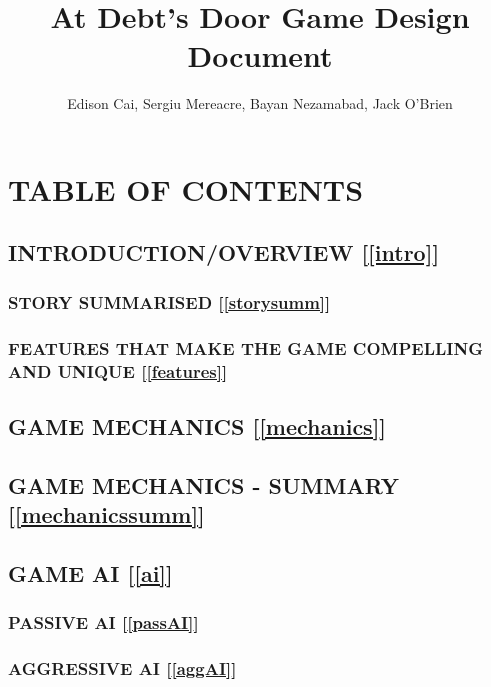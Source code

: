 \documentclass{article}
\author{Edison Cai, Sergiu Mereacre, Bayan Nezamabad, Jack O'Brien}
\title{At Debt's Door Game Design Document}
\begin{document}
\maketitle
\setcounter{section}{-1}
\section{TABLE OF CONTENTS}

%

\subsection{INTRODUCTION/OVERVIEW [\ref{intro}]}

\subsubsection{STORY SUMMARISED [\ref{storysumm}]}

\subsubsection{FEATURES THAT MAKE THE GAME COMPELLING AND UNIQUE [\ref{features}]}

%

\subsection{GAME MECHANICS [\ref{mechanics}]}

%

\subsection{GAME MECHANICS - SUMMARY [\ref{mechanicssumm}]}

%

\subsection{GAME AI [\ref{ai}]}

\subsubsection{PASSIVE AI [\ref{passAI}]}

\subsubsection{AGGRESSIVE AI [\ref{aggAI}]}
\end{document}
